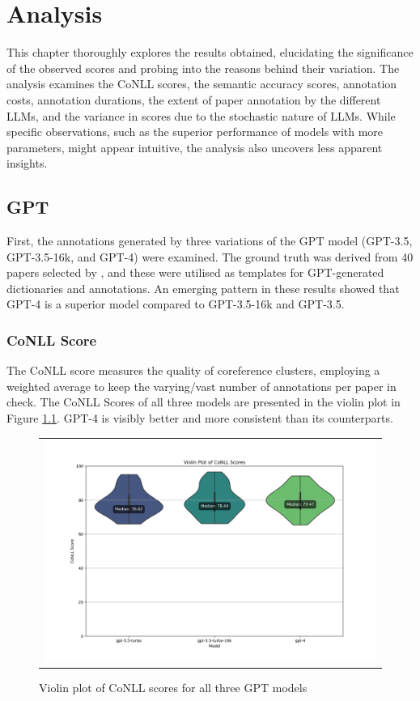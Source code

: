 \chapter{Analysis}\label{chapter:analysis}

This chapter thoroughly explores the results obtained, elucidating the significance of the observed scores and probing into the reasons behind their variation. The analysis examines the CoNLL scores, the semantic accuracy scores, annotation costs, annotation durations, the extent of paper annotation by the different \ac{LLMs}, and the variance in scores due to the stochastic nature of \ac{LLMs}. While specific observations, such as the superior performance of models with more parameters, might appear intuitive, the analysis also uncovers less apparent insights.

\section{GPT}
First, the annotations generated by three variations of the GPT model (GPT-3.5, GPT-3.5-16k, and GPT-4) were examined. The ground truth was derived from 40 papers selected by \citet{asakura2022building}, and these were utilised as templates for GPT-generated dictionaries and annotations. An emerging pattern in these results showed that GPT-4 is a superior model compared to GPT-3.5-16k and GPT-3.5. 

\subsection{CoNLL Score}
The CoNLL score measures the quality of coreference clusters, employing a weighted average to keep the varying/vast number of annotations per paper in check. The CoNLL Scores of all three models are presented in the violin plot in Figure \ref{fig:violin-conll}. GPT-4 is visibly better and more consistent than its counterparts.

\begin{figure}[htpb]
  \centering
  \begin{tabular}{c}
  \includegraphics[width=14cm]{images/conll-score.png}
  \end{tabular}
  \caption[Distribution of CoNLL Score]{Violin plot of CoNLL scores for all three GPT models}\label{fig:violin-conll}
\end{figure}

